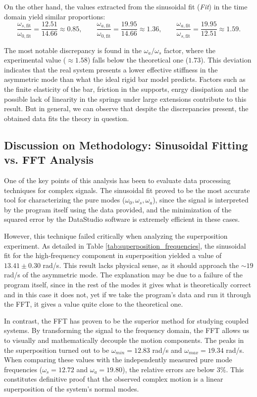 \documentclass[a4paper,11pt]{article}
\begin{document}
On the other hand, the values extracted from the sinusoidal fit (\textit{Fit}) in the time domain yield similar proportions:
\begin{equation}
\frac{\omega_{s,\text{fit}}}{\omega_{0,\text{fit}}} = \frac{12.51}{14.66} \approx 0.85, \qquad
\frac{\omega_{a,\text{fit}}}{\omega_{0,\text{fit}}} = \frac{19.95}{14.66} \approx 1.36, \qquad
\frac{\omega_{a,\text{fit}}}{\omega_{s,\text{fit}}} = \frac{19.95}{12.51} \approx 1.59.
\end{equation}

The most notable discrepancy is found in the $\omega_a / \omega_s$ factor, where the experimental value ($\approx 1.58$) falls below the theoretical one ($1.73$). This deviation indicates that the real system presents a lower effective stiffness in the asymmetric mode than what the ideal rigid bar model predicts. Factors such as the finite elasticity of the bar, friction in the supports, enrgy dissipation and the possible lack of linearity in the springs under large extensions contribute to this result. But in general, we can observe that despite the discrepancies present, the obtained data fits the theory in question.

\subsection{Discussion on Methodology: Sinusoidal Fitting vs. FFT Analysis}
One of the key points of this analysis has been to evaluate data processing techniques for complex signals. The sinusoidal fit proved to be the most accurate tool for characterizing the pure modes ($\omega_0, \omega_s, \omega_a$), since the signal is interpreted by the program itself using the data provided, and the minimization of the squared error by the DataStudio software is extremely efficient in these cases.

However, this technique failed critically when analyzing the superposition experiment. As detailed in Table \ref{tab:superposition_frequencies}, the sinusoidal fit for the high-frequency component in superposition yielded a value of $13.41 \pm 0.30$ rad/s. This result lacks physical sense, as it should approach the $\sim 19$ rad/s of the asymmetric mode. The explanation may be due to a failure of the program itself, since in the rest of the modes it gives what is theoretically correct and in this case it does not, yet if we take the program's data and run it through the FFT, it gives a value quite close to the theoretical one.

In contrast, the FFT has proven to be the superior method for studying coupled systems. By transforming the signal to the frequency domain, the FFT allows us to visually and mathematically decouple the motion components. The peaks in the superposition turned out to be $\omega_{min} = 12.83$ rad/s and $\omega_{max} = 19.34$ rad/s. When comparing these values with the independently measured pure mode frequencies ($\omega_s = 12.72$ and $\omega_a = 19.80$), the relative errors are below $3\%$. This constitutes definitive proof that the observed complex motion is a linear superposition of the system's normal modes.
\end{document}
